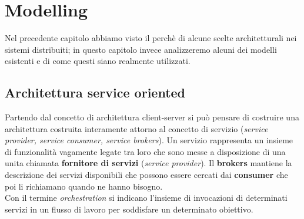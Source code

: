 \label{capitolo3}
\section{Modelling}
Nel precedente capitolo abbiamo visto il perchè di alcune scelte architetturali nei sistemi distribuiti; in questo capitolo invece analizzeremo alcuni dei modelli esistenti e di come questi siano realmente utilizzati.
\subsection{Architettura service oriented}
Partendo dal concetto di architettura client-server si può pensare di costruire una architettura costruita interamente attorno al concetto di servizio (\emph{service provider, service consumer, service brokers}). Un servizio rappresenta un insieme di funzionalità vagamente legate tra loro che sono messe a disposizione di una unita chiamata \textbf{fornitore di servizi} (\emph{service provider}). Il \textbf{brokers} mantiene la descrizione dei servizi disponibili che possono essere cercati dai \textbf{consumer} che poi li richiamano quando ne hanno bisogno.\\
Con il termine \emph{orchestration} si indicano l'insieme di invocazioni di determinati servizi in un flusso di lavoro per soddisfare un determinato obiettivo.
